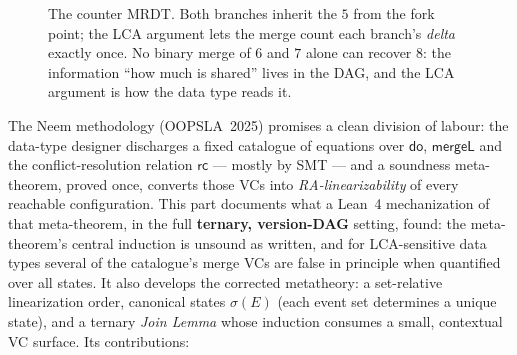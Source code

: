 \documentclass[11pt]{article}
\newcommand{\rcrel}{\mathsf{rc}}                 %
\newcommand{\mergeL}{\mathsf{mergeL}}
\begin{document}
\begin{figure}[t]
\centering
{}
\caption{The counter MRDT. Both branches inherit the $5$ from the fork
point; the LCA argument lets the merge count each branch's \emph{delta}
exactly once. No binary merge of $6$ and $7$ alone can recover $8$: the
information ``how much is shared'' lives in the DAG, and the LCA argument
is how the data type reads it.}
\label{fig:counter}
\end{figure}

The Neem methodology (OOPSLA~2025) promises a clean division of labour:
the data-type designer discharges a fixed catalogue of equations over
$\mathsf{do}$, $\mergeL$ and the conflict-resolution relation
$\rcrel$ --- mostly by SMT --- and a soundness meta-theorem, proved
once, converts those VCs into \emph{RA-linearizability} of every reachable
configuration. This part documents what a Lean~4 mechanization of that
meta-theorem, in the full \textbf{ternary, version-DAG} setting, found:
the meta-theorem's central induction is unsound as written, and for
LCA-sensitive data types several of the catalogue's merge VCs are false
in principle when quantified over all states. It also develops the
corrected metatheory: a set-relative linearization order, canonical
states $\sigma(E)$ (each event set determines a unique state), and a
ternary \emph{Join Lemma} whose induction
consumes a small, contextual VC surface. Its contributions:
\end{document}
